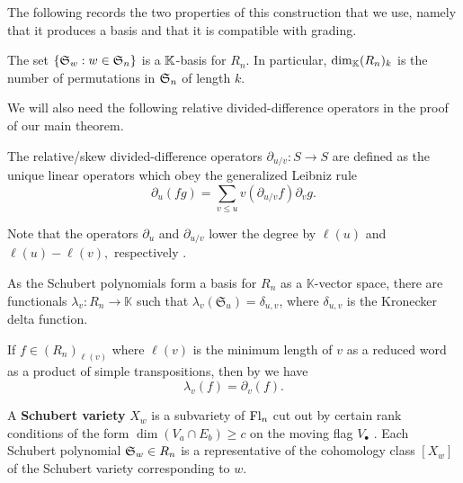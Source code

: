 The following records the two properties of this construction that we use, namely that it produces a basis and that it is compatible with grading.

\begin{proposition}
\label{prop: schuberts form a basis for Rn}
    The set $\{\mathfrak{S}_w:w\in\mathfrak{S}_n\}$ is a $\mathbb{K}$-basis for $R_n.$ In particular, $\dim_{\mathbb{K}}(R_n)_k$ is the number of permutations in $\mathfrak{S}_n$ of length $k.$
\end{proposition}

We will also need the following relative divided-difference operators in the proof of our main theorem.
\begin{definition}\cite{Macdonald}
\label{def:relative-diff-oper} 
The relative/skew divided-difference operators \(\partial_{u/v}:S\to S\) are defined as the unique linear operators which obey the generalized Leibniz rule 
\begin{equation}
\label{eq:generalized-leibniz}
 \partial_u(fg) = \sum_{v\leq u}
 v\!\left(\partial_{u/v}f\right)\partial_vg.
\end{equation}
\end{definition}

\begin{remark}
    Note that the operators $\partial_u$ and $\partial_{u/v}$ lower the degree by $\ell(u)$ and $\ell(u)-\ell(v),$ respectively \cite[Ch.~II,~Eq.~2.17]{Macdonald}.
\end{remark}

\begin{definition}
\label{def:linear-functionals}
As the Schubert polynomials form a basis for $R_n$ as a $\mathbb{K}$-vector space, there are functionals $\lambda_v:R_n \to \mathbb{K}$ such that  $\lambda_v(\mathfrak{S}_u) = \delta_{u,v}$, where $\delta_{u,v}$ is the Kronecker delta function.
\end{definition}

\begin{remark}
\label{rem:lin-func-length}
If \(f\in(R_n)_{\ell(v)}\) where $\ell(v)$ is the minimum length of $v$ as a reduced word as a product of simple transpositions, then by \cite[Ch.~IV,~Eq.~4.2]{Macdonald} we have
\begin{equation}
\label{eq:coefficient-dd}
 \lambda_v(f)=\partial_v(f).
\end{equation}
\end{remark}

A \textbf{Schubert variety} $X_w$ is a subvariety of $\mathrm{Fl}_n$ cut out by certain rank conditions of the form $\dim(V_a\cap E_b)\geq c$ on the moving flag $V_\bullet$ \cite[Ch.~1]{Handbook}. 
Each Schubert polynomial $\mathfrak{S}_w\in R_n$ is a representative of the cohomology class $[X_w]$ of the Schubert variety corresponding to $w$.

